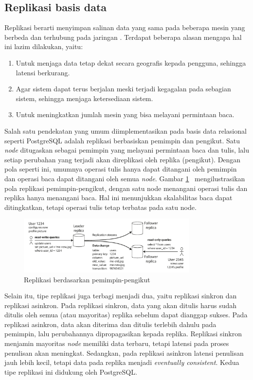 \subsection{Replikasi basis data}

Replikasi berarti menyimpan salinan data yang sama pada beberapa mesin yang berbeda dan terhubung pada jaringan \parencite{dataIntensiveApplications}. Terdapat beberapa alasan mengapa hal ini lazim dilakukan, yaitu:

\begin{enumerate}
    \item Untuk menjaga data tetap dekat secara geografis kepada pengguna, sehingga latensi berkurang.
    \item Agar sistem dapat terus berjalan meski terjadi kegagalan pada sebagian sistem, sehingga menjaga ketersediaan sistem.
    \item Untuk meningkatkan jumlah mesin yang bisa melayani permintaan baca.
\end{enumerate}

Salah satu pendekatan yang umum diimplementasikan pada basis data relasional seperti PostgreSQL adalah replikasi berbasiskan pemimpin dan pengikut. Satu \textit{node} ditugaskan sebagai pemimpin yang melayani permintaan baca dan tulis, lalu setiap perubahan yang terjadi akan direplikasi oleh replika (pengikut). Dengan pola seperti ini, umumnya operasi tulis hanya dapat ditangani oleh pemimpin dan operasi baca dapat ditangani oleh semua \textit{node}. Gambar \ref{fig:leader-based-replication} \ mengilustrasikan pola replikasi pemimpin-pengikut, dengan satu node menangani operasi tulis dan replika hanya menangani baca. Hal ini menunjukkan skalabilitas baca dapat ditingkatkan, tetapi operasi tulis tetap terbatas pada satu node.

\begin{figure}[H]
    \centering
    \includegraphics[width=0.8\textwidth]{resources/chapter-2/leader-based-replication.png}
    \caption{Replikasi berdasarkan pemimpin-pengikut \parencite{dataIntensiveApplications}}
    \label{fig:leader-based-replication}
\end{figure}

Selain itu, tipe replikasi juga terbagi menjadi dua, yaitu replikasi sinkron dan replikasi asinkron. Pada replikasi sinkron, data yang akan ditulis harus sudah ditulis oleh semua (atau mayoritas) replika sebelum dapat dianggap sukses. Pada replikasi asinkron, data akan diterima dan ditulis terlebih dahulu pada pemimpin, lalu perubahannya dipropagasikan kepada replika. Replikasi sinkron menjamin mayoritas \textit{node} memiliki data terbaru, tetapi latensi pada proses penulisan akan meningkat. Sedangkan, pada replikasi asinkron latensi penulisan jauh lebih kecil, tetapi data pada replika menjadi \textit{eventually consistent}. Kedua tipe replikasi ini didukung oleh PostgreSQL.
